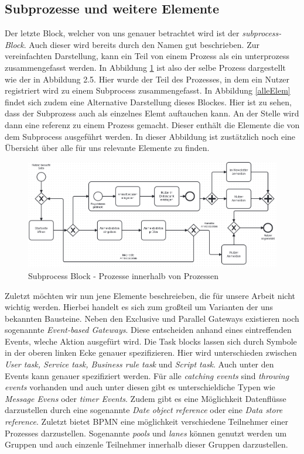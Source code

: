 \subsection{Subprozesse und weitere Elemente}\label{Subprozesse und weitere Elemente}
Der letzte Block, welcher von uns genauer betrachtet wird ist der \textit{subprocess-Block}. Auch dieser wird bereits durch den Namen gut beschrieben. Zur vereinfachten Darstellung, kann ein Teil von einem Prozess als ein unterprozess zusammengefasst werden. In Abbildung \ref{subprozess} ist also der selbe Prozess dargestellt wie der in Abbildung 2.5. Hier wurde der Teil des Prozesses, in dem ein Nutzer registriert wird zu einem Subprocess zusammengefasst. In Abbildung \ref{alleElem} findet sich zudem eine Alternative Darstellung dieses Blockes. Hier ist zu sehen, dass der Subprozess auch als einzelnes Elemt auftauchen kann. An der Stelle wird dann eine referenz zu einem Prozess gemacht. Dieser enthält die Elemente die von dem Subprocess ausgeführt werden. In dieser Abbildung ist zustätzlich noch eine Übersicht über alle für uns relevante Elemente zu finden.\\
\begin{figure}
\centering
\includegraphics[scale=0.5]{Figures/Beispiel7}
\decoRule
\caption[Subprocess Block]{Subprocess Block - Prozesse innerhalb von Prozessen}
\label{subprozess}
\end{figure}Zuletzt möchten wir nun jene Elemente beschreieben, die für unsere Arbeit nicht wichtig werden. Hierbei handelt es sich zum großteil um Varianten der uns bekannten Bausteine. Neben den Exclusive und Parallel Gateways existieren noch sogenannte \textit{Event-based Gateways}. Diese entscheiden anhand eines eintreffenden Events, wleche Aktion ausgefürt wird. 
Die Task blocks lassen sich durch Symbole in der oberen linken Ecke genauer spezifizieren. Hier wird unterschieden zwischen \textit{User task, Service task, Business rule task} und \textit{Script task}. Auch unter den Events kann genauer spezifiziert werden. Für alle \textit{catching events} sind \textit{throwing events} vorhanden und auch unter diesen gibt es unterschieldiche Typen wie \textit{Message Evens} oder \textit{timer Events}. Zudem gibt es eine Möglichkeit Datenflüsse darzustellen durch eine sogenannte \textit{Date object reference} oder eine \textit{Data store reference}. Zuletzt bietet BPMN eine möglichkeit verschiedene Teilnehmer einer Prozesses darzustellen. Sogenannte \textit{pools} und \textit{lanes} können genutzt werden um Gruppen und auch einzenle Teilnehmer innerhalb dieser Gruppen darzustellen.\\
